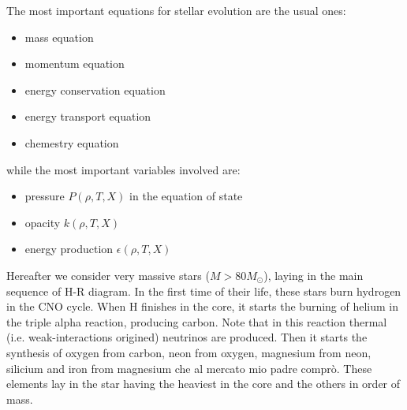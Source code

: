 \documentclass[main.tex]{subfiles}
\begin{document}
The most important equations for stellar evolution are the usual ones:
\begin{itemize}
    \item mass equation
    \item momentum equation
    \item energy conservation equation
    \item energy transport equation
    \item chemestry equation
\end{itemize}
%
while the most important variables involved are:
%
\begin{itemize}
    \item pressure $P(\rho,T,X)$ in the equation of state
    \item opacity $k(\rho,T,X)$
    \item energy production $\epsilon(\rho,T,X)$
\end{itemize}

Hereafter we consider very massive stars (\(M > 80 M_{\odot}\)), laying in the main sequence of H-R diagram. In the first time of their life, these stars burn hydrogen in the CNO cycle. When H finishes in the core, it starts the burning of helium in the triple alpha reaction, producing carbon. Note that in this reaction thermal (i.e. weak-interactions origined) neutrinos are produced.
Then it starts the synthesis of oxygen from carbon, neon from oxygen, magnesium from neon, silicium and iron from magnesium che al mercato mio padre comprò. These elements lay in the star having the heaviest in the core and the others in order of mass.
\end{document}
